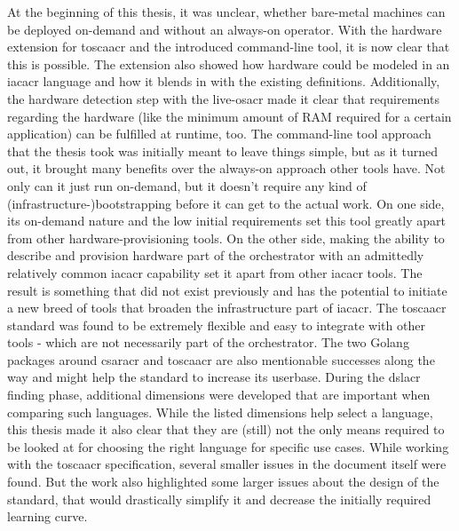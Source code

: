 At the beginning of this thesis, it was unclear, whether bare-metal machines can be deployed on-demand and without an always-on operator. With the hardware extension for \gls{toscaacr} and the introduced command-line tool, it is now clear that this is possible.
\newline
The extension also showed how hardware could be modeled in an \gls{iacacr} language and how it blends in with the existing definitions.
\newline
Additionally, the hardware detection step with the live-\gls{osacr} made it clear that requirements regarding the hardware (like the minimum amount of RAM required for a certain application) can be fulfilled at runtime, too.
\newline\smallskip
The command-line tool approach that the thesis took was initially meant to leave things simple, but as it turned out, it brought many benefits over the always-on approach other tools have. Not only can it just run on-demand, but it doesn't require any kind of (infrastructure-)bootstrapping before it can get to the actual work.
\newline
On one side, its on-demand nature and the low initial requirements set this tool greatly apart from other hardware-provisioning tools. On the other side, making the ability to describe and provision hardware part of the orchestrator with an admittedly relatively common \gls{iacacr} capability set it apart from other \gls{iacacr} tools. The result is something that did not exist previously and has the potential to initiate a new breed of tools that broaden the infrastructure part of \gls{iacacr}.
\newline\smallskip
The \gls{toscaacr} standard was found to be extremely flexible and easy to integrate with other tools - which are not necessarily part of the orchestrator. The two Golang packages around \gls{csaracr} and \gls{toscaacr} are also mentionable successes along the way and might help the standard to increase its userbase.
\newline
During the \gls{dslacr} finding phase, additional dimensions were developed that are important when comparing such languages. While the listed dimensions help select a language, this thesis made it also clear that they are (still) not the only means required to be looked at for choosing the right language for specific use cases.
\newline
While working with the \gls{toscaacr} specification, several smaller issues in the document itself were found. But the work also highlighted some larger issues about the design of the standard, that would drastically simplify it and decrease the initially required learning curve.
